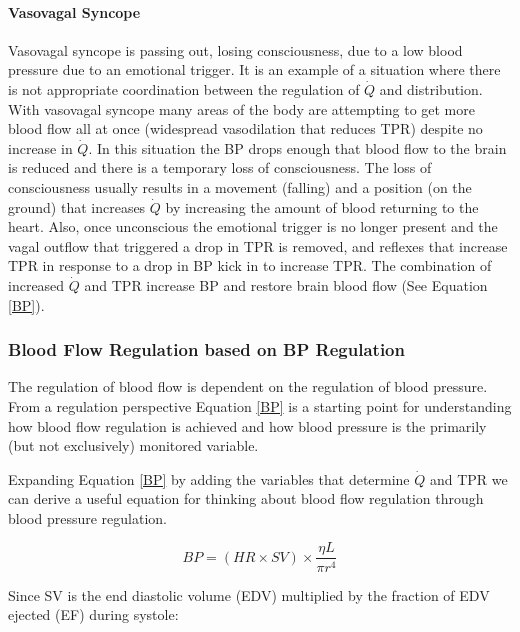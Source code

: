 \paragraph{Vasovagal Syncope}
Vasovagal syncope is passing out, losing consciousness, due to a low blood pressure due to an emotional trigger. It is an example of a situation where there is not appropriate coordination between the regulation of $\dot{Q}$ and distribution. With vasovagal syncope many areas of the body are attempting to get more blood flow all at once (widespread vasodilation that reduces TPR) despite no increase in $\dot{Q}$. In this situation the BP drops enough that blood flow to the brain is reduced and there is a temporary loss of consciousness. The loss of consciousness usually results in a movement (falling) and a position (on the ground) that increases $\dot{Q}$ by increasing the amount of blood returning to the heart. Also, once unconscious the emotional trigger is no longer present and the vagal outflow that triggered a drop in TPR is removed, and reflexes that increase TPR in response to a drop in BP kick in to increase TPR. The combination of increased $\dot{Q}$ and TPR increase BP and restore brain blood flow (See Equation \ref{BP}).

\subsubsection{Blood Flow Regulation based on BP Regulation}

The regulation of blood flow is dependent on the regulation of blood pressure. From a regulation perspective Equation \ref{BP} is a starting point for understanding how blood flow regulation is achieved and how blood pressure is the primarily (but not exclusively\footnotemark{}) monitored variable.

Expanding Equation \ref{BP} by adding the variables that determine $\dot{Q}$ and TPR we can derive a useful equation for thinking about blood flow regulation through blood pressure regulation.

\begin{equation}
    BP = (HR \times SV) \times \frac{\eta L}{\pi r^4}
\end{equation}

Since SV is the end diastolic volume (EDV) multiplied by the fraction of EDV ejected (EF) during systole:

